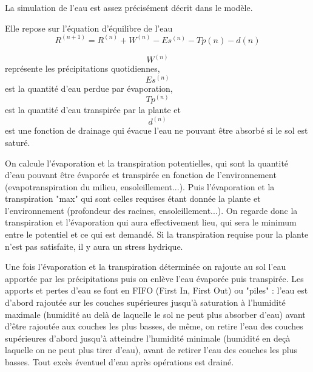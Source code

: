 La simulation de l'eau est assez précisément décrit dans le modèle. 

Elle repose sur l'équation d'équilibre de l'eau
\[ {R^{(n+1)}}=R^{(n)}+W^{(n)}-Es^{(n)}-Tp{(n)}-d{(n)}\]

\[W^{(n)}\] représente les précipitations quotidiennes,\[Es^{(n)}\] est la quantité d'eau perdue par évaporation, \[Tp^{(n)}\] est la quantité d'eau transpirée par la plante et \[d^{(n)}\] est une fonction de drainage qui évacue l'eau ne pouvant être absorbé si le sol est saturé. 

On calcule l'évaporation et la transpiration potentielles, qui sont la quantité d'eau pouvant être évaporée et transpirée en fonction de l'environnement (evapotranspiration du milieu, ensoleillement...). 
Puis l'évaporation et la transpiration "max" qui sont celles requises étant donnée la plante et l'environnement (profondeur des racines, ensoleillement...). 
On regarde donc la transpiration et l'évaporation qui aura effectivement lieu, qui sera le minimum entre le potentiel et ce qui est demandé.
Si la transpiration requise pour la plante n'est pas satisfaite, il y aura un stress hydrique. 

Une fois l'évaporation et la transpiration déterminée on rajoute au sol l'eau apportée par les précipitations puis on enlève l'eau évaporée puis transpirée. Les apports et pertes d'eau se font en FIFO (First In, First Out) ou "piles" : l'eau est d'abord rajoutée sur les couches supérieures jusqu'à saturation à l'humidité maximale (humidité au delà de laquelle le sol ne peut plus absorber d'eau) avant d'être rajoutée aux couches les plus basses, de même, on retire l'eau des couches supérieures d'abord jusqu'à atteindre l'humidité minimale (humidité en deçà laquelle on ne peut plus tirer d'eau), avant de retirer l'eau des couches les plus basses.
Tout excès éventuel d'eau après opérations est drainé.
